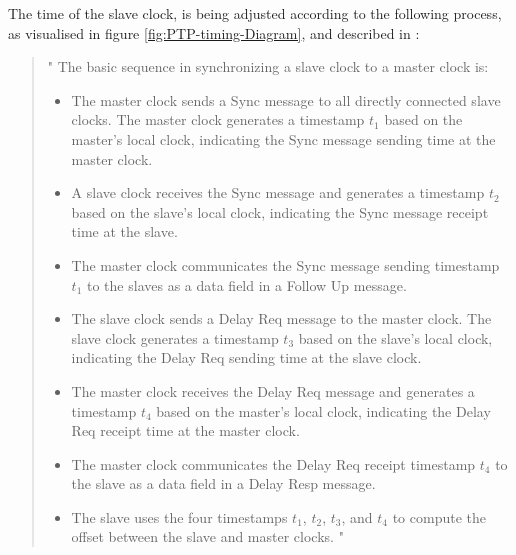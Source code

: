 The time of the slave clock, is being adjusted according to the following process, as visualised in figure \ref{fig:PTP-timing-Diagram}, and described in \cite[p. 51]{Eidson2006}:


\begin{quotation}
    
   " The basic sequence in synchronizing a slave clock to a master clock is:
    \begin{itemize}
        \item The master clock sends a Sync message to all directly connected slave
clocks. The master clock generates a timestamp $t_1$ based on the master’s
local clock, indicating the Sync message sending time at the master clock.
\item A slave clock receives the Sync message and generates a timestamp $t_2$
based on the slave’s local clock, indicating the Sync message receipt time
at the slave.
\item The master clock communicates the Sync message sending timestamp $t_1$
to the slaves as a data field in a Follow Up message.
\item The slave clock sends a Delay Req message to the master clock. The slave
clock generates a timestamp $t_3$ based on the slave’s local clock, indicating
the Delay Req sending time at the slave clock.
\item The master clock receives the Delay Req message and generates a timestamp $t_4$ based on the master’s local clock, indicating the Delay Req receipt time at the master clock.
\item The master clock communicates the Delay Req receipt timestamp $t_4$ to
the slave as a data field in a Delay Resp message.
\item The slave uses the four timestamps $t_1$, $t_2$, $t_3$, and $t_4$ to compute the offset
between the slave and master clocks. "\cite[p. 51]{Eidson2006}
    
    \end{itemize} 
\end{quotation}


